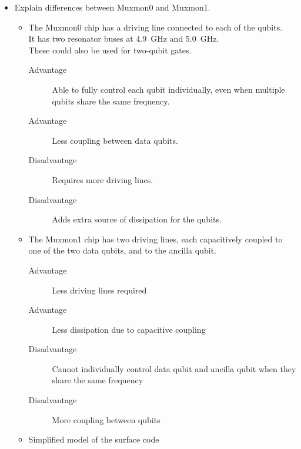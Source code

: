 \documentclass[12pt]{report}
\begin{document}
\begin{itemize}
      \item Explain differences between Muxmon0 and Muxmon1.
      \begin{itemize}
        \item The Muxmon0 chip has a driving line connected to each of the qubits. \\
            It has two resonator buses at \SI{4.9}{\giga \hertz} and \SI{5.0}{\giga \hertz}. \\
            These could also be used for two-qubit gates.
        \begin{description}
          \item[Advantage] Able to fully control each qubit individually, even when multiple qubits share the same frequency.
          \item[Advantage] Less coupling between data qubits.
          \item[Disadvantage] Requires more driving lines.
          \item[Disadvantage] Adds extra source of dissipation for the qubits.
        \end{description}
        \item The Muxmon1 chip has two driving lines, each capacitively coupled to one of the two data qubits, and to the ancilla qubit.
        \begin{description}
          \item[Advantage] Less driving lines required
          \item[Advantage] Less dissipation due to capacitive coupling
          \item[Disadvantage] Cannot individually control data qubit and ancilla qubit when they share the same frequency
          \item[Disadvantage] More coupling between qubits
        \end{description}
        \item Simplified model of the surface code
      \end{itemize}


\end{itemize}
\end{document}
